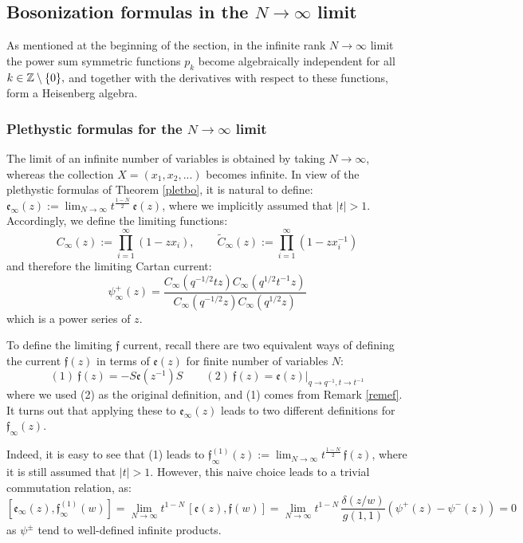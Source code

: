 \subsection{Bosonization formulas in the $N\to\infty$ limit}
As mentioned at the beginning of the section, in the infinite rank $N\to\infty$ limit the  power sum symmetric functions $p_k$ become algebraically independent for all $k\in {\mathbb Z}\setminus\{0\},$ and together with the derivatives with respect to these functions, form a Heisenberg algebra.

\subsubsection{Plethystic formulas for the $N\to\infty$ limit}

The limit of an infinite number of variables is obtained by taking $N\to\infty$, whereas the collection $X=(x_1,x_2,...)$ becomes infinite. 
In view of the plethystic formulas of Theorem \ref{pletbo}, it is natural to define:
${\mathfrak e}_\infty(z) :=\lim_{N\to \infty} t^{\frac{1-N}{2}}\, {\mathfrak e}(z)$, where we implicitly assumed that $|t|>1$.
Accordingly, we define the limiting functions:
$$C_\infty(z):=\prod_{i=1}^\infty (1-z x_i),\qquad 
{\widetilde C}_\infty(z):=\prod_{i=1}^\infty (1-z x_i^{-1})$$
and therefore the limiting Cartan current:
\begin{equation}
\label{psip}
\psi_\infty^{+}(z)=\frac{C_\infty(q^{-1/2}t z)C_\infty(q^{1/2}t^{-1} z)}{C_\infty(q^{-1/2} z)C_\infty(q^{1/2} z)}
\end{equation}
which is a power series of $z$.

To define the limiting ${\mathfrak f}$ current,
recall there are two equivalent ways of defining the current ${\mathfrak f}(z)$ in terms of ${\mathfrak e}(z)$ for
finite number of variables $N$:
$$(1)\ {\mathfrak f}(z)=-S{\mathfrak e}(z^{-1})S\qquad (2) \  {\mathfrak f}(z)={\mathfrak e}(z)\vert_{q\to q^{-1},t\to t^{-1}}$$
where we used (2) as the original definition, and (1) comes from Remark \ref{remef}.
It turns out that applying these to ${\mathfrak e}_\infty(z)$ leads to two different definitions for ${\mathfrak f}_\infty(z)$.

Indeed, it is easy to see that (1) leads to 
${\mathfrak f}^{(1)}_\infty(z) :=\lim_{N\to \infty} t^{\frac{1-N}{2}}\, {\mathfrak f}(z)$,
where it is still assumed that $|t|>1$. However, this naive choice leads to a trivial commutation relation, as:
$$[{\mathfrak e}_\infty(z),{\mathfrak f}^{(1)}_\infty(w)]=
\lim_{N\to\infty} t^{1-N}\, [{\mathfrak e}(z),{\mathfrak f}(w)]=\lim_{N\to\infty} t^{1-N}\, \frac{\delta(z/w)}{g(1,1)}(\psi^+(z)-\psi^-(z))=0$$
as $\psi^\pm$ tend to well-defined infinite products.

